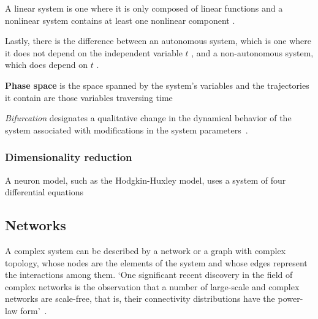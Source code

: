 \documentclass[../../Orator.tex]{subfiles}
\begin{document}
A linear system is one where it is only composed of linear functions and a nonlinear system contains at least one nonlinear component \cite{}.

Lastly, there is the difference between an autonomous system, which is one where it does not depend on the independent variable \(t\) \cite{}, and a non-autonomous system, which does depend on \(t\) \cite{}.


\begin{comment}
    \begin{split}\left[\begin{array}{ccll}
    {\displaystyle \frac{du}{dt}} &=& u\left(1-u^{2}\right)-w+I \equiv F(u,w)\\[.2cm]
    {\displaystyle \frac{dw}{dt}} &=& \varepsilon \left(u -0.5w+1\right) \equiv \varepsilon G(u,w)\, ,\\
    \end{array}\right.\end{split}
    [ref:https://neuronaldynamics-exercises.readthedocs.io/en/latest/exercises/brunel-network.html]
\end{comment}

\textbf{Phase space} is the space spanned by the system's variables and the trajectories it contain are those variables traversing time

\textit{Bifurcation} designates a qualitative change in the dynamical behavior of the system associated with modifications in the system parameters~\cite{STEFANESCU2012748}.




\subsubsection{Dimensionality reduction}
A neuron model, such as the Hodgkin-Huxley model, uses a system of four differential equations

\subsection*{Networks}
A complex system can be described by a network or a graph with complex topology, whose nodes are the elements of the system and whose edges represent the interactions among them. `One significant recent discovery in the field of complex networks is the observation that a number of large-scale and complex networks are scale-free, that is, their connectivity distributions have the
power-law form'~\cite{wang2002synchronization}.
\end{document}
